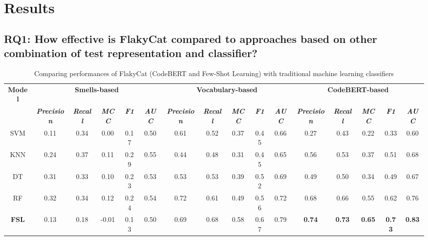 \section{Results}
\label{sec:flakycat-resuts}

\subsection{RQ1: How effective is FlakyCat compared to approaches based on other combination of test representation and classifier? } 

\begin{table}[htbp]
\caption{Comparing performances of FlakyCat (CodeBERT and Few-Shot Learning) with traditional machine learning classifiers}
\centering
\begin{tabular}{|c|c|c|c|c|c|c|c|c|c|c|c|c|c|c|c|}
\hline
\textbf{Model} & \multicolumn{5}{|c|}{\textbf{Smells-based}} & \multicolumn{5}{|c|}{\textbf{Vocabulary-based}} &\multicolumn{5}{|c|}{\textbf{CodeBERT-based}} \\
\cline{2-16} 
\textbf{} & \textbf{\textit{Precision}}& \textbf{\textit{Recall}} & \textbf{\textit{ MCC}}& \textbf{\textit{F1}} & \textbf{\textit{AUC}}& \textbf{\textit{Precision}}& \textbf{\textit{Recall}} & \textbf{\textit{ MCC}}& \textbf{\textit{F1}} & \textbf{\textit{AUC}} & \textbf{\textit{Precision}}& \textbf{\textit{Recall}} &\textbf{\textit{ MCC}}& \textbf{\textit{F1}} & \textbf{\textit{AUC}}\\
\hline


SVM & 0.11 & 0.34 & 0.00 & 0.17 & 0.50
& 0.61 & 0.52 & 0.37 & 0.45 & 0.66 
& 0.27 & 0.43 & 0.22 & 0.33 & 0.60 \\

\hline

KNN & 0.24 & 0.37 & 0.11 & 0.29 & 0.55
& 0.44 & 0.48 & 0.31 & 0.45 & 0.65 
& 0.56 & 0.53 & 0.37 & 0.51 & 0.68 \\

\hline

DT & 0.31 & 0.33 & 0.10 & 0.23 & 0.53 
& 0.53 & 0.53 & 0.39 & 0.52 & 0.69
& 0.49 & 0.50 & 0.34 & 0.49 & 0.67 \\

\hline

RF & 0.32 & 0.34 & 0.12 & 0.24 & 0.54
& 0.72 & 0.61 & 0.49 & 0.56 & 0.72 
& 0.68 & 0.66 & 0.55 & 0.62 & 0.76 \\

\hline
\textbf{FSL} & 0.13 & 0.18 & -0.01 & 0.13 & 0.50 
& 0.69 & 0.68 & 0.58 & 0.67 & 0.79
& \textbf{0.74} &\textbf{0.73} & \textbf{0.65} & \textbf{0.73} & \textbf{0.83} \\
\hline
\end{tabular}
\label{scores}
\vspace{-5mm}
\end{table}

